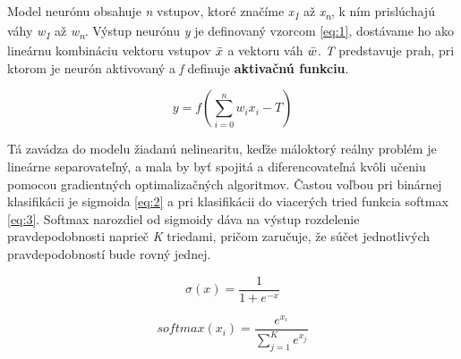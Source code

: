 Model neurónu obsahuje \textit{n} vstupov, ktoré značíme \textit{x\textsubscript{1}} až \textit{x\textsubscript{n}}, k ním prislúchajú váhy \textit{w\textsubscript{1}} až \textit{w\textsubscript{n}}. Výstup neurónu \textit{y} je definovaný vzorcom \ref{eq:1}, dostávame ho ako lineárnu kombináciu vektoru vstupov \textit{\( \Bar{x} \)} a vektoru váh \textit{\( \Bar{w} \)}. \textit{T} predstavuje prah, pri ktorom je neurón aktivovaný a \textit{f} definuje \textbf{aktivačnú funkciu}. 

\begin{equation} 
    \label{eq:1}
    y = f(\sum_{i=0}^{n} w_i x_i - T)
\end{equation}

Tá zavádza do modelu žiadanú nelinearitu, keďže máloktorý reálny problém je lineárne separovateľný, a mala by byť spojitá a diferencovateľná kvôli učeniu pomocou gradientných optimalizačných algoritmov. Častou voľbou pri binárnej klasifikácii je sigmoida \ref{eq:2} a pri klasifikácii do viacerých tried funkcia softmax \ref{eq:3}. Softmax narozdiel od sigmoidy dáva na výstup rozdelenie pravdepodobnosti naprieč \textit{K} triedami, pričom zaručuje, že súčet jednotlivých pravdepodobností bude rovný jednej.\cite{Zou2008}\cite{yegnanarayana2009artificial}\cite{mehrotra1997elements}

\vspace{5pt}
\noindent
\begin{minipage}[t]{.45\textwidth}
    \begin{equation} 
        \label{eq:2}
        \sigma(x) = \frac{1}{1 + e^{-x}}
    \end{equation}
\end{minipage}
\hfill
\begin{minipage}[t]{.45\textwidth}
    \begin{equation} 
        \label{eq:3}
        softmax(x_i) = \frac{e^{x_i}}{\sum_{j=1}^{K} e^{x_j}}
    \end{equation}
\end{minipage}
\vspace{5pt}

